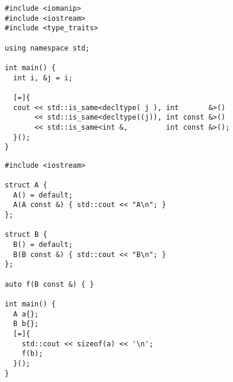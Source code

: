 \begin{frame}[fragile]
  \begin{lstlisting}
#include <iomanip>
#include <iostream>
#include <type_traits>

using namespace std;

int main() {
  int i, &j = i;

  [=]{
  cout << std::is_same<decltype( j ), int       &>()
       << std::is_same<decltype((j)), int const &>()
       << std::is_same<int &,         int const &>();
  }();
}
  \end{lstlisting}
\end{frame}
\begin{frame}[fragile]
  \begin{lstlisting}
#include <iostream>

struct A {
  A() = default;
  A(A const &) { std::cout << "A\n"; }
};

struct B {
  B() = default;
  B(B const &) { std::cout << "B\n"; }
};

auto f(B const &) { }

int main() {
  A a{};
  B b{};
  [=]{
    std::cout << sizeof(a) << '\n';
    f(b);
  }();
}
  \end{lstlisting}
\end{frame}
